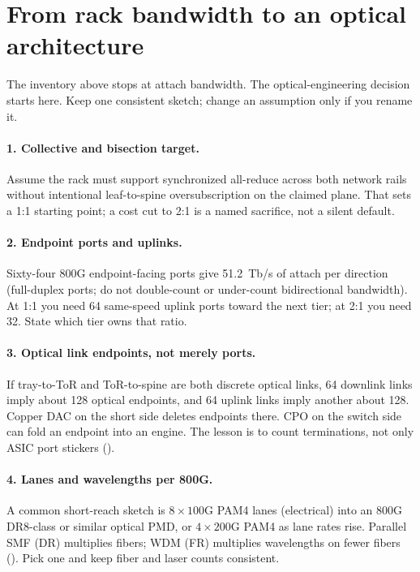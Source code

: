 \section{From rack bandwidth to an optical architecture}
\label{sec:hpc-rack-to-phy}

The inventory above stops at attach bandwidth. The optical-engineering decision
starts here. Keep one consistent sketch; change an assumption only if you
rename it.

\paragraph{1. Collective and bisection target.}
Assume the rack must support synchronized all-reduce across both network rails
without intentional leaf-to-spine oversubscription on the claimed plane. That
sets a 1:1 starting point; a cost cut to 2:1 is a named sacrifice, not a silent
default.

\paragraph{2. Endpoint ports and uplinks.}
Sixty-four 800G endpoint-facing ports give 51.2~Tb/s of attach per direction
(full-duplex ports; do not double-count or under-count bidirectional
bandwidth). At 1:1 you need 64 same-speed uplink ports toward the next tier; at
2:1 you need 32. State which tier owns that ratio.

\paragraph{3. Optical link endpoints, not merely ports.}
If tray-to-ToR and ToR-to-spine are both discrete optical links, 64 downlink
links imply about 128 optical endpoints, and 64 uplink links imply another
about 128. Copper DAC on the short side deletes endpoints there. CPO on the
switch side can fold an endpoint into an engine. The lesson is to count
terminations, not only ASIC port stickers ().

\paragraph{4. Lanes and wavelengths per 800G.}
A common short-reach sketch is $8\times100$G PAM4 lanes (electrical) into an
800G DR8-class or similar optical PMD, or $4\times200$G PAM4 as lane rates
rise. Parallel SMF (DR) multiplies fibers; WDM (FR) multiplies wavelengths on
fewer fibers (). Pick one and keep fiber and laser
counts consistent.

